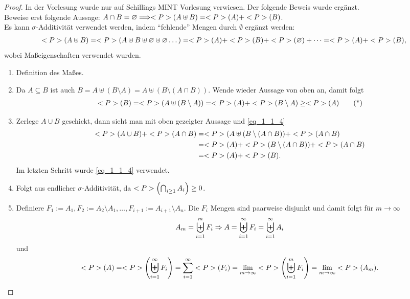 \begin{proof}
	In der Vorlesung wurde nur auf Schillings MINT Vorlesung verwiesen. Der folgende Beweis wurde ergänzt.\\
	Beweise erst folgende Aussage: $A\cap B = \varnothing \Longrightarrow <P>(A \uplus B) = <P>(A) + <P>(B)$.\\
	Es kann $\sigma$-Additivität verwendet werden, indem ``fehlende'' Mengen durch $\emptyset$ ergänzt werden:
	\begin{align}
		<P>(A \uplus B) = <P>(A \uplus B \uplus \varnothing \uplus \varnothing \dots) = <P>(A) + <P>(B) + <P>(\varnothing) + \dots = <P>(A) + <P>(B),\notag
	\end{align}
	wobei Maßeigenschaften verwendet wurden.
	\begin{enumerate}
		\item Definition des Maßes.
		\item Da $A \subseteq B$ ist auch $B = A \uplus (B \setminus A) = A \uplus (B \setminus (A \cap B))$. Wende wieder Aussage von oben an, damit folgt
		\begin{align}
			<P>(B) = <P>(A \uplus (B \setminus A)) = <P>(A) + <P>(B \setminus A) \ge <P>(A) \label{eq_1_1_4}\tag{*}
		\end{align}
		\item Zerlege $A \cup B$ geschickt, dann sieht man mit oben gezeigter Aussage und \cref{eq_1_1_4}
		\begin{align}
			<P>(A \cup B) + <P>(A \cap B) &= <P>(A \uplus (B \setminus (A \cap B)) + <P>(A \cap B)\notag \\
			&= <P>(A) + <P>(B \setminus (A \cap B)) + <P>(A \cap B)\notag\\
			&= <P>(A)+<P>(B).\notag	
		\end{align}
		Im letzten Schritt wurde \cref{eq_1_1_4} verwendet.
		\item Folgt aus endlicher $\sigma$-Additivität, da $<P>\left(\bigcap_{i\ge 1} A_i \right) \ge 0$.
		\item Definiere $F_1 := A_1, F_2 := A_2 \setminus A_1, \dots, F_{i+1} := A_{i+1}\setminus A_n$. Die $F_i$ Mengen sind paarweise disjunkt und damit folgt für $m \to \infty$
		\begin{align}
			A_m = \biguplus_{i=1}^{m} F_i \Rightarrow A = \biguplus_{i=1}^{\infty} F_i = \biguplus_{i=1}^{\infty} A_i\notag
		\end{align}
		und
		\begin{align}
			<P>(A) = <P>\left( \biguplus_{i=1}^{\infty} F_i \right) = \sum_{i=1}^{\infty} <P>(F_i) = \lim\limits_{m \to \infty} <P>\left( \biguplus_{i=1}^{m} F_i \right) = \lim\limits_{m\to \infty} <P>(A_m). \notag
		\end{align}
	\end{enumerate}
\end{proof}


